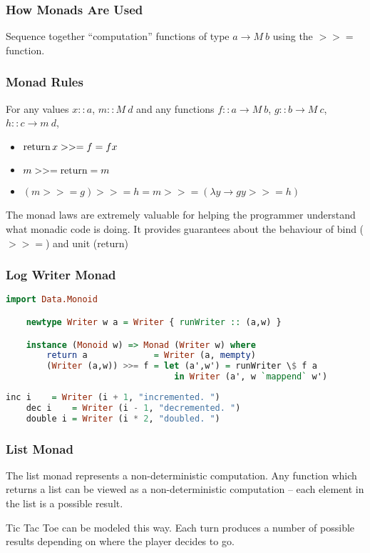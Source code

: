 \documentclass[presentation.tex]{subfiles}
\begin{document}
\begin{frame}
  \frametitle{How Monads Are Used}

  Sequence together ``computation'' functions of type $a \rightarrow
  M\ b$ using the $>>=$ function.
\end{frame}

\begin{frame}
  \frametitle{Monad Rules}
  For any values $x::a$, $m::M\ d$ and any functions $f::a \rightarrow M\ b$, $g::b \rightarrow M\ c$, $h::c \rightarrow m\ d$,
  \begin{itemize}
  \item
    $\operatorname{return} x >>= f = f x$
  \item
    $m >>= \operatorname{return} = m$
  \item
    $(m >>= g) >>= h = m >>= (\lambda y \rightarrow g y >>= h)$
  \end{itemize}

  The monad laws are extremely valuable for helping the programmer
  understand what monadic code is doing. It provides guarantees about
  the behaviour of bind ($>>=$) and unit (return)
\end{frame}


\begin{frame}[fragile]
  \frametitle{Log Writer Monad}
  \begin{lstlisting}[frame=single,language=Haskell,breaklines=true]
    import Data.Monoid

    newtype Writer w a = Writer { runWriter :: (a,w) }

    instance (Monoid w) => Monad (Writer w) where
        return a             = Writer (a, mempty)
        (Writer (a,w)) >>= f = let (a',w') = runWriter \$ f a
                                 in Writer (a', w `mappend` w')
  \end{lstlisting}
  \pause
  \begin{lstlisting}[frame=single,language=Haskell,breaklines=true]
    inc i    = Writer (i + 1, "incremented. ")
    dec i    = Writer (i - 1, "decremented. ")
    double i = Writer (i * 2, "doubled. ")
  \end{lstlisting}
\end{frame}

\begin{frame}
  \frametitle{List Monad}

  The list monad represents a non-deterministic computation. Any
  function which returns a list can be viewed as a non-deterministic
  computation -- each element in the list is a possible result.

  Tic Tac Toe can be modeled this way. Each turn produces a number of
  possible results depending on where the player decides to go.
\end{frame}
\end{document}

